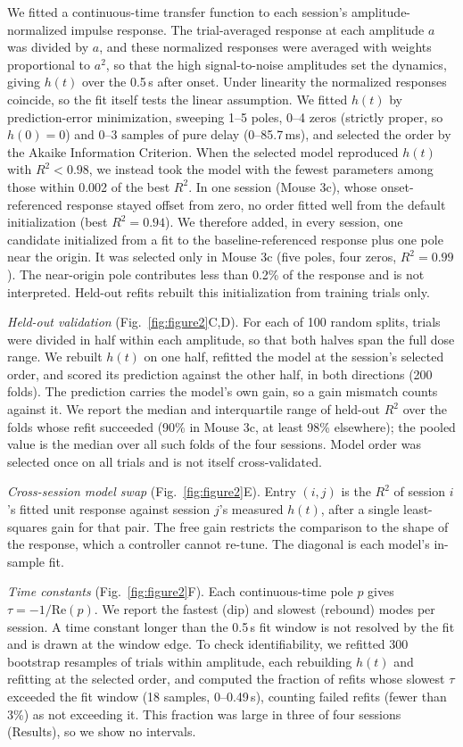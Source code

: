 We fitted a continuous-time transfer function to each session's
amplitude-normalized impulse response. The trial-averaged response at each
amplitude $a$ was divided by $a$, and these normalized responses were averaged
with weights proportional to $a^{2}$, so that the high signal-to-noise
amplitudes set the dynamics, giving $h(t)$ over the 0.5\,s after onset. Under
linearity the normalized responses coincide, so the fit itself tests the linear
assumption. We fitted $h(t)$ by prediction-error minimization, sweeping 1--5
poles, 0--4 zeros (strictly proper, so $h(0) = 0$) and 0--3 samples of pure
delay (0--85.7\,ms), and selected the order by the Akaike Information Criterion.
When the selected model reproduced $h(t)$ with $R^{2} < 0.98$, we instead took
the model with the fewest parameters among those within 0.002 of the best
$R^{2}$. In one session (Mouse 3c), whose onset-referenced response stayed offset
from zero, no order fitted well from the default initialization (best
$R^2 = 0.94$). We therefore added, in every session, one candidate initialized
from a fit to the baseline-referenced response plus one pole near the origin.
It was selected only in Mouse 3c (five poles, four zeros, $R^{2} = 0.99$). The
near-origin pole contributes less than 0.2\% of the response and is not
interpreted. Held-out refits rebuilt this initialization from training trials
only.

\emph{Held-out validation} (Fig.~\ref{fig:figure2}C,D). For each of 100 random
splits, trials were divided in half within each amplitude, so that both halves
span the full dose range. We rebuilt $h(t)$ on one half, refitted the model at
the session's selected order, and scored its prediction against the other half,
in both directions (200 folds). The prediction carries the model's own gain, so
a gain mismatch counts against it. We report the median and interquartile range
of held-out $R^{2}$ over the folds whose refit succeeded (90\% in Mouse 3c, at
least 98\% elsewhere); the pooled value is the median over all such folds of the
four sessions. Model order was selected once on all trials and is not itself
cross-validated.

\emph{Cross-session model swap} (Fig.~\ref{fig:figure2}E). Entry $(i,j)$ is the
$R^{2}$ of session $i$'s fitted unit response against session $j$'s measured
$h(t)$, after a single least-squares gain for that pair. The free gain restricts
the comparison to the shape of the response, which a controller cannot re-tune.
The diagonal is each model's in-sample fit.

\emph{Time constants} (Fig.~\ref{fig:figure2}F). Each continuous-time pole $p$
gives $\tau = -1/\mathrm{Re}(p)$. We report the fastest (dip) and slowest
(rebound) modes per session. A time constant longer than the 0.5\,s fit window
is not resolved by the fit and is drawn at the window edge. To check
identifiability, we refitted 300 bootstrap resamples of trials within amplitude,
each rebuilding $h(t)$ and refitting at the selected order, and computed the
fraction of refits whose slowest $\tau$ exceeded the fit window (18 samples,
0--0.49\,s), counting failed refits (fewer than 3\%) as not exceeding it.
This fraction was large in three of four sessions (Results), so we show no
intervals.

